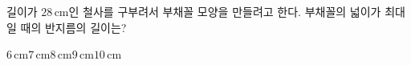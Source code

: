 길이가 $28\,\mathrm{cm}$인 철사를 구부려서 부채꼴 모양을 만들려고 한다. 부채꼴의 넓이가 최대일 때의 반지름의 길이는?
\begin{choices32}{$6\,\mathrm{cm}$}{$7\,\mathrm{cm}$}{$8\,\mathrm{cm}$}{$9\,\mathrm{cm}$}{$10\,\mathrm{cm}$}\end{choices32}
